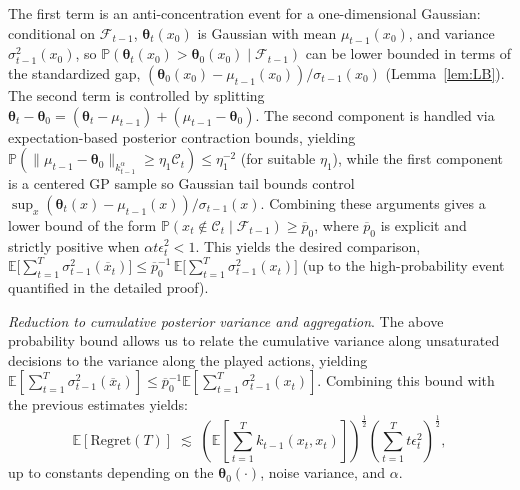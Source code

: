 \documentclass[final,12pt]{colt2026} %
\begin{document}
The first term is an anti-concentration event for a one-dimensional Gaussian: conditional on $\mathcal{F}_{t-1}$, $\pmb\theta_t(x_0)$ is Gaussian with mean $\mu_{t-1}(x_0)$, and variance $\sigma_{t-1}^2(x_0)$, so $\mathbb{P}(\pmb\theta_t(x_0)>\pmb\theta_0(x_0)\mid\mathcal{F}_{t-1})$ can be lower bounded in terms of the standardized gap, $(\pmb\theta_0(x_0)-\mu_{t-1}(x_0))/\sigma_{t-1}(x_0)$ (Lemma~\ref{lem:LB}). The second term is controlled by splitting
$\pmb\theta_t-\pmb\theta_0 = (\pmb\theta_t-\mu_{t-1})+(\mu_{t-1}-\pmb\theta_0)$.
The second component is handled via expectation-based posterior contraction bounds, yielding
$\mathbb{P}(\|\mu_{t-1}-\pmb\theta_0\|_{k_{t-1}^{\alpha}}\ge \eta_1\mathcal{C}_t)\le \eta_1^{-2}$
(for suitable $\eta_1$), while the first component is a centered GP sample so Gaussian tail bounds control
$\sup_x (\pmb\theta_t(x)-\mu_{t-1}(x))/\sigma_{t-1}(x)$.
Combining these arguments gives a lower bound of the form
$\mathbb{P}(x_t\notin\mathcal{C}_t\mid\mathcal{F}_{t-1})\ge \overline{p}_0$,
where $\overline{p}_0$ is explicit and strictly positive when $\alpha t\epsilon_t^2<1$. This yields the desired comparison,
$\mathbb{E}\big[\sum_{t=1}^T \sigma_{t-1}^2(\overline{x}_t)\big]
\le \overline{p}_0^{-1}\,\mathbb{E}\big[\sum_{t=1}^T \sigma_{t-1}^2(x_t)\big]$
(up to the high-probability event quantified in the detailed proof).

\medskip
\noindent\textit{Reduction to cumulative posterior variance and aggregation}.
The above probability bound allows us to relate the cumulative variance along unsaturated decisions to the variance along the played actions, yielding
$
\mathbb{E}\!\left[\sum_{t=1}^T \sigma_{t-1}^2(\overline{x}_t)\right]
\le
\overline{p}_0^{-1}
\mathbb{E}\!\left[\sum_{t=1}^T \sigma_{t-1}^2(x_t)\right].
$
Combining this bound with the previous estimates yields:
\[
\mathbb{E}[\mathrm{Regret}(T)]
\;\lesssim\;
\left(\mathbb{E}\!\left[\sum_{t=1}^T k_{t-1}(x_t,x_t)\right]\right)^{\frac{1}{2}}
\left(\sum_{t=1}^T t\epsilon_t^2\right)^{\frac{1}{2}},
\]
up to constants depending on the $\pmb\theta_0(\cdot)$, noise variance, and $\alpha$.
\end{document}
